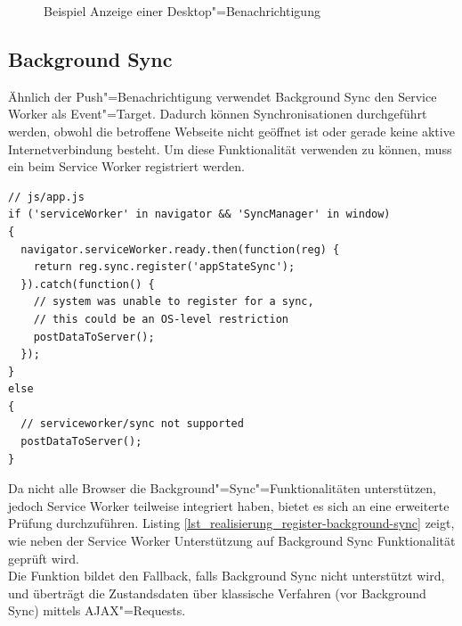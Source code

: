 \begin{figure}[htp] 
\caption{Beispiel Anzeige einer Desktop"=Benachrichtigung}
\label{image_implementierung_notification}
\end{figure} 

\newpage
\subsection{Background Sync}
\label{subsec_implementierung_background-sync}

Ähnlich der Push"=Benachrichtigung verwendet Background Sync den Service Worker als Event"=Target. Dadurch können Synchronisationen durchgeführt werden, obwohl die betroffene Webseite nicht geöffnet ist oder gerade keine aktive Internetverbindung besteht. Um diese Funktionalität verwenden zu können, muss ein  beim Service Worker registriert werden. \\

\begin{lstlisting}[caption={Registrierung Background Sync},label={lst_realisierung_register-background-sync}, frame=single]
// js/app.js
if ('serviceWorker' in navigator && 'SyncManager' in window) 
{
  navigator.serviceWorker.ready.then(function(reg) {
    return reg.sync.register('appStateSync');
  }).catch(function() {
    // system was unable to register for a sync,
    // this could be an OS-level restriction
    postDataToServer();
  });
}
else 
{
  // serviceworker/sync not supported
  postDataToServer();
}
\end{lstlisting}

Da nicht alle Browser die Background"=Sync"=Funktionalitäten unterstützen, jedoch Service Worker teilweise integriert haben, bietet es sich an eine erweiterte Prüfung durchzuführen. Listing \ref{lst_realisierung_register-background-sync} zeigt, wie neben der Service Worker Unterstützung auf Background Sync Funktionalität geprüft wird. \\
Die Funktion  bildet den Fallback, falls Background Sync nicht unterstützt wird, und überträgt die Zustandsdaten über \glqq klassische\grqq{} Verfahren (vor Background Sync) mittels AJAX"=Requests.\\

